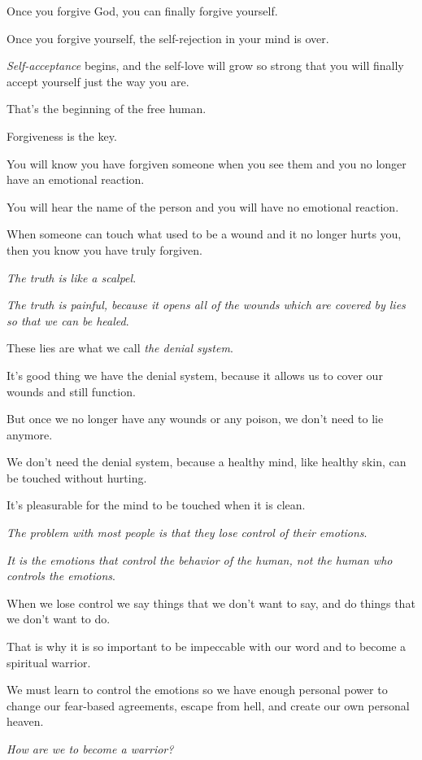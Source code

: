 \documentclass{article}
\numberwithin{equation}{section}
\begin{document}
Once you forgive God, you can finally forgive yourself.

Once you forgive yourself, the self-rejection in your mind is over.

\textit{Self-acceptance} begins, and the self-love will grow so strong that you will finally accept yourself just the way you are.

That's the beginning of the free human.

Forgiveness is the key.

%
You will know you have forgiven someone when you see them and you no longer have an emotional reaction.

You will hear the name of the person and you will have no emotional reaction.

When someone can touch what used to be a wound and it no longer hurts you, then you know you have truly forgiven.

%
\textit{The truth is like a scalpel}.

\textit{The truth is painful, because it opens all of the wounds which are covered by lies so that we can be healed}.

These lies are what we call \textit{the denial system}.

It's good thing we have the denial system, because it allows us to cover our wounds and still function.

But once we no longer have any wounds or any poison, we don't need to lie anymore.

We don't need the denial system, because a healthy mind, like healthy skin, can be touched without hurting.

It's pleasurable for the mind to be touched when it is clean.

%
\textit{The problem with most people is that they lose control of their emotions}.

\textit{It is the emotions that control the behavior of the human, not the human who controls the emotions}.

When we lose control we say things that we don't want to say, and do things that we don't want to do.

That is why it is so important to be impeccable with our word and to become a spiritual warrior.

We must learn to control the emotions so we have enough personal power to change our fear-based agreements, escape from hell, and create our own personal heaven.

%
\textit{How are we to become a warrior?}
\end{document}
